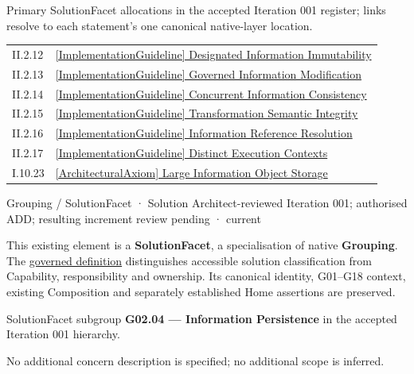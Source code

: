 Primary SolutionFacet allocations in the accepted Iteration 001 register; links resolve to each statement’s one canonical native-layer location.\par
\begin{longtable}{p{.22\linewidth}p{.73\linewidth}}
II.2.12 & \hyperref[element:f9ac3424852f4c30b5b152c7a007c704]{[ImplementationGuideline] Designated Information Immutability} \\
II.2.13 & \hyperref[element:d08bf41d719c43e3bc1a54bd79d95741]{[ImplementationGuideline] Governed Information Modification} \\
II.2.14 & \hyperref[element:0b0be077a4d449e29d72048634e276e4]{[ImplementationGuideline] Concurrent Information Consistency} \\
II.2.15 & \hyperref[element:45c752faef034d3eb04ef6580f1dcc97]{[ImplementationGuideline] Transformation Semantic Integrity} \\
II.2.16 & \hyperref[element:b5c3dcfd6ece40fdb6c8694924db2ae6]{[ImplementationGuideline] Information Reference Resolution} \\
II.2.17 & \hyperref[element:d0af3f7b7f9947008b3b066eefe73617]{[ImplementationGuideline] Distinct Execution Contexts} \\
I.10.23 & \hyperref[element:06ac0b10e0614c5cb33499c1e6c4edc7]{[ArchitecturalAxiom] Large Information Object Storage} \\
\end{longtable}
\label{element:8b7fd22a55434e5ca3e7ba87afb020d6}
{\small Grouping / SolutionFacet · Solution Architect-reviewed Iteration 001; authorised ADD; resulting increment review pending · current}\par

This existing element is a \textbf{SolutionFacet}, a specialisation of native
\textbf{Grouping}. The \href{\detokenize{../../../../../../../governance/continuum-representation.md#solutionfacet-classification--1119-candidate}}{governed definition}
distinguishes accessible solution classification from Capability, responsibility
and ownership. Its canonical identity, G01–G18 context, existing Composition
and separately established Home assertions are preserved.



SolutionFacet subgroup \textbf{G02.04 — Information Persistence} in the accepted Iteration 001 hierarchy.



No additional concern description is specified; no additional scope is inferred.



